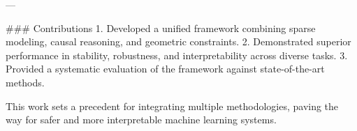 ---

### Contributions  
1. Developed a unified framework combining sparse modeling, causal reasoning, and geometric constraints.  
2. Demonstrated superior performance in stability, robustness, and interpretability across diverse tasks.  
3. Provided a systematic evaluation of the framework against state-of-the-art methods.  

This work sets a precedent for integrating multiple methodologies, paving the way for safer and more interpretable machine learning systems.